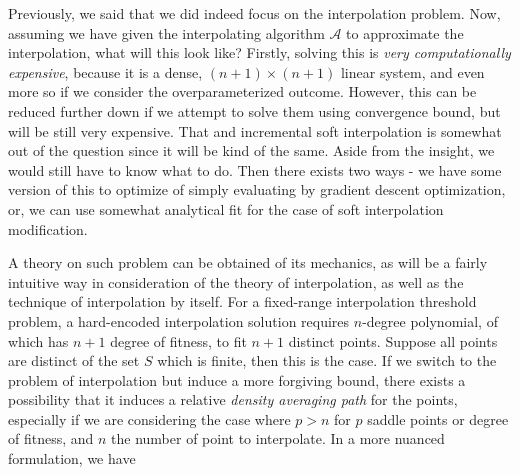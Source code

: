 \documentclass[10pt]{article} %
\begin{document}
Previously, we said that we did indeed focus on the interpolation problem. Now, assuming we have given the interpolating algorithm $\mathcal{A}$ to approximate the interpolation, what will this look like? Firstly, solving this is \textit{very computationally expensive}, because it is a dense, $(n+1)\times(n+1)$ linear system, and even more so if we consider the overparameterized outcome. However, this can be reduced further down if we attempt to solve them using convergence bound, but will be still very expensive. That and incremental soft interpolation is somewhat out of the question since it will be kind of the same. Aside from the insight, we would still have to know what to do. Then there exists two ways - we have some version of this to optimize of simply evaluating by gradient descent optimization, or, we can use somewhat analytical fit for the case of soft interpolation modification. 

A theory on such problem can be obtained of its mechanics, as will be a fairly intuitive way in consideration of the theory of interpolation, as well as the technique of interpolation by itself. For a fixed-range interpolation threshold problem, a hard-encoded interpolation solution requires $n$-degree polynomial, of which has $n+1$ degree of fitness, to fit $n+1$ distinct points. Suppose all points are distinct of the set $S$ which is finite, then this is the case. If we switch to the problem of interpolation but induce a more forgiving bound, there exists a possibility that it induces a relative \textit{density averaging path} for the points, especially if we are considering the case where $p>n$ for $p$ saddle points or degree of fitness, and $n$ the number of point to interpolate. In a more nuanced formulation, we have
\end{document}
